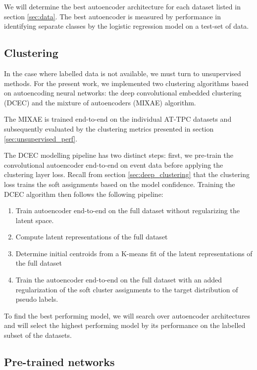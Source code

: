 We will determine the best autoencoder architecture for each dataset listed in section \ref{sec:data}. The best autoencoder is measured by performance in identifying separate classes by the logistic regression model on a test-set of data. 

\subsection{Clustering}

In the case where labelled data is not available, we must turn to unsupervised methods. For the present work, we implemented two clustering algorithms based on autoencoding neural networks: the deep convolutional embedded clustering (DCEC) and the mixture of autoencoders (MIXAE) algorithm. 

The MIXAE is trained end-to-end on the individual AT-TPC datasets and subsequently evaluated by the clustering metrics presented in section \ref{sec:unsupervised_perf}.

The DCEC modelling pipeline has two distinct steps: first, we pre-train the convolutional autoencoder end-to-end on event data before applying the clustering layer loss. Recall from section \ref{sec:deep_clustering} that the clustering loss trains the soft assignments based on the model confidence. Training the DCEC algorithm then follows the following pipeline: 

\begin{enumerate}
\item Train autoencoder end-to-end on the full dataset without regularizing the latent space. 
\item Compute latent representations of the full dataset
\item Determine initial centroids from a K-means fit of the latent representations of the full dataset
\item Train the autoencoder end-to-end on the full dataset with an added regularization of the soft cluster assignments to the target distribution of pseudo labels.
\end{enumerate}

To find the best performing model, we will search over autoencoder architectures and will select the highest performing model by its performance on the labelled subset of the datasets.

\subsection{Pre-trained networks}

